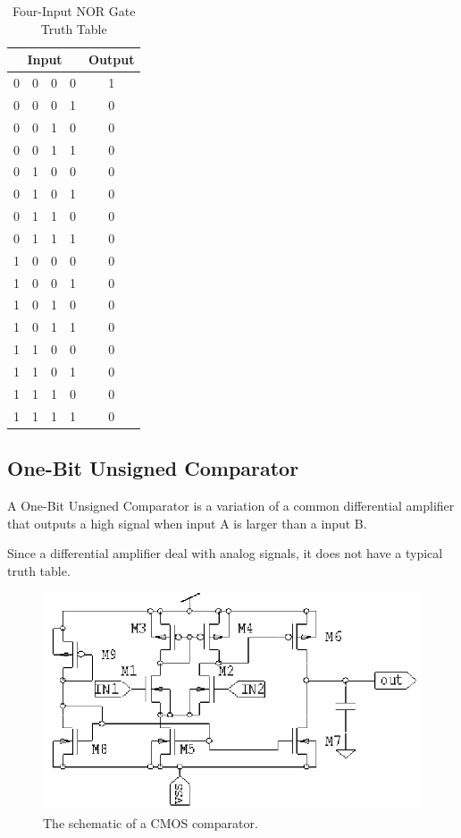 \documentclass[conference]{IEEEtran}
\begin{document}
\begin{table}[htbp]
\caption{Four-Input NOR Gate Truth Table}
\begin{center}
\begin{tabular}{|c|c|c|c|c|}
\hline
\multicolumn{4}{|c|}{\textbf{Input}} & \textbf{Output} \\
\hline
0 & 0 & 0 & 0 & 1 \\
\hline
0 & 0 & 0 & 1 & 0 \\
\hline
0 & 0 & 1 & 0 & 0 \\
\hline
0 & 0 & 1 & 1 & 0 \\
\hline
0 & 1 & 0 & 0 & 0 \\
\hline
0 & 1 & 0 & 1 & 0 \\
\hline
0 & 1 & 1 & 0 & 0 \\
\hline
0 & 1 & 1 & 1 & 0 \\
\hline
1 & 0 & 0 & 0 & 0 \\
\hline
1 & 0 & 0 & 1 & 0 \\
\hline
1 & 0 & 1 & 0 & 0 \\
\hline
1 & 0 & 1 & 1 & 0 \\
\hline
1 & 1 & 0 & 0 & 0 \\
\hline
1 & 1 & 0 & 1 & 0 \\
\hline
1 & 1 & 1 & 0 & 0 \\
\hline
1 & 1 & 1 & 1 & 0 \\
\hline
\end{tabular}
\end{center}
\end{table}

\subsection{One-Bit Unsigned Comparator}

A One-Bit Unsigned Comparator is a variation of a common differential amplifier that outputs a high signal when input A is larger than a input B.

Since a differential amplifier deal with analog signals, it does not have a typical truth table.

\begin{figure}[htbp]
\centerline{\includegraphics{CompSch.png}}
\caption{The schematic of a CMOS comparator.}
\end{figure}
\end{document}
